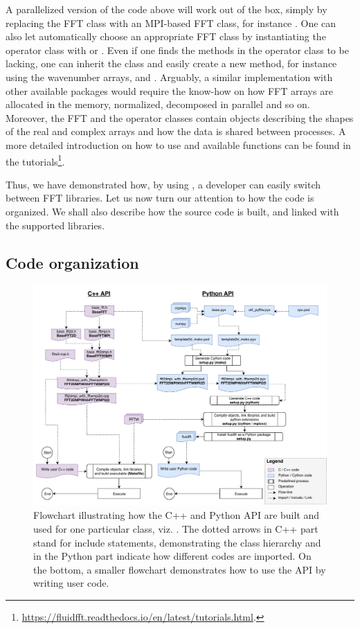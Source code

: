 \documentclass{../jors}
\begin{document}
A parallelized version of the code above will work out of the box, simply by
replacing the FFT class with an MPI-based FFT class, for instance
. One can also let  automatically
choose an appropriate FFT class by instantiating the operator class with
 or . Even if one finds the methods
in the operator class to be lacking, one can inherit the class and easily create a
new method, for instance using the wavenumber arrays,  and
.  Arguably, a similar implementation with other available
packages would require the know-how on how FFT arrays are allocated in the memory,
normalized, decomposed in parallel and so on.
%
Moreover, the FFT and the operator classes contain objects describing the shapes
of the real and complex arrays and how the data is shared between processes.
%
A more detailed introduction on how
to use  and available functions can be found in the
tutorials\footnote{%
\url{https://fluidfft.readthedocs.io/en/latest/tutorials.html}.}.

Thus, we have demonstrated how, by using , a developer can
easily switch between FFT libraries.
%
Let us now turn our attention to how the code is organized. We shall also describe
how the source code is built, and linked with the supported libraries.

\subsection*{Code organization}
\begin{figure}[htp]
  \centering
  \includegraphics[width=0.96\linewidth]{Pyfig/fig_build_use}
  \caption{Flowchart illustrating how the C++ and Python API are built and used
  for one particular class, viz. . The dotted
  arrows in C++ part stand for include statements, demonstrating the class
  hierarchy and in the Python part indicate how different codes are imported. On
  the bottom, a smaller flowchart demonstrates how to use the API by writing user
  code.  }\label{fig:build_use}
\end{figure}
\end{document}
